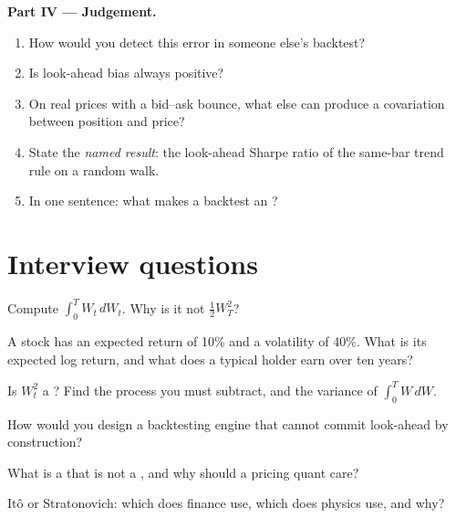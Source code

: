 \begin{problem}
\medskip\noindent\textbf{Part IV --- Judgement.}
\begin{enumerate}[resume]
\item How would you detect this error in someone else's backtest?
\item Is look-ahead bias always positive?
\item On real prices with a bid--ask bounce, what else can produce a covariation between position and price?
\item State the \emph{named result}: the look-ahead Sharpe ratio of the same-bar trend rule on a random walk.
\item In one sentence: what makes a backtest an ?
\end{enumerate}
\end{problem}

\section{Interview questions}

\begin{interviewq}\label{iq:qm:ito-calculus:1}
Compute $\int_0^TW_t\,dW_t$. Why is it not $\tfrac12W_T^2$?
\end{interviewq}

\begin{interviewq}\label{iq:qm:ito-calculus:2}
A stock has an expected return of 10\% and a volatility of 40\%. What is its expected log return,
and what does a typical holder earn over ten years?
\end{interviewq}

\begin{interviewq}\label{iq:qm:ito-calculus:3}
Is $W_t^2$ a ? Find the process you must subtract, and the variance of $\int_0^TW\,dW$.
\end{interviewq}

\begin{interviewq}\label{iq:qm:ito-calculus:4}
How would you design a backtesting engine that cannot commit look-ahead by construction?
\end{interviewq}

\begin{interviewq}\label{iq:qm:ito-calculus:5}
What is a  that is not a , and why should a pricing quant care?
\end{interviewq}

\begin{interviewq}\label{iq:qm:ito-calculus:6}
Itô or Stratonovich: which does finance use, which does physics use, and why?
\end{interviewq}
